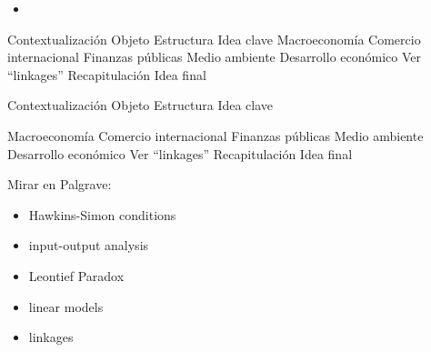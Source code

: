 \documentclass{nuevotema}
\begin{document}
\ideaclave


\begin{itemize}
	\item
\end{itemize}

\esquemacorto

\begin{esquema}[enumerate]
	\1[] 
		\2 Contextualización
		\2 Objeto
		\2 Estructura
	\1 
		\2 Idea clave
	\1 
	\1 
		\2 Macroeconomía
		\2 Comercio internacional
		\2 Finanzas públicas
		\2 Medio ambiente
		\2 Desarrollo económico
			\3 Ver ``linkages''
	\1[] 
		\2 Recapitulación
		\2 Idea final

\end{esquema}

\esquemalargo












\begin{esquemal}
	\1[] 
		\2 Contextualización
		\2 Objeto
		\2 Estructura
	\1 
		\2 Idea clave
		
	\1 
	\1 
		\2 Macroeconomía
		\2 Comercio internacional
		\2 Finanzas públicas
		\2 Medio ambiente
		\2 Desarrollo económico
			\3 Ver ``linkages''
	\1[] 
		\2 Recapitulación
		\2 Idea final
\end{esquemal}























\preguntas

\notas

\bibliografia

Mirar en Palgrave:
\begin{itemize}
	\item Hawkins-Simon conditions
	\item input-output analysis
	\item Leontief Paradox
	\item linear models
	\item linkages
\end{itemize}
\end{document}
